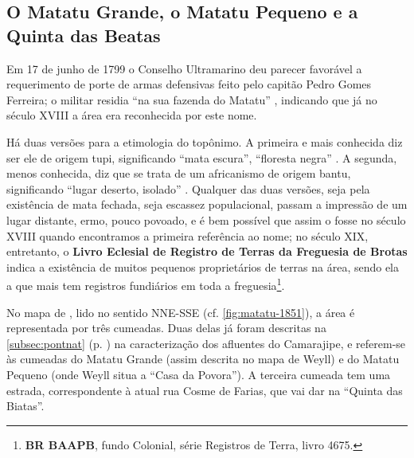 \subsection{O Matatu Grande, o Matatu Pequeno e a Quinta das Beatas}\label{subsec:matatubeatas}

Em 17 de junho de 1799 o Conselho Ultramarino deu parecer favorável a requerimento de porte de armas defensivas feito pelo capitão Pedro Gomes Ferreira; o militar residia ``na sua fazenda do Matatu'' \cite[p.~228]{castralmeida_ultramar_1914}, indicando que já no século XVIII a área era reconhecida por este nome. 

Há duas versões para a etimologia do topônimo. A primeira e mais conhecida diz ser ele de origem tupi, significando ``mata escura'', ``floresta negra'' \cite[p.~281]{sampaio_tupi_1987}. A segunda, menos conhecida, diz que se trata de um africanismo de origem bantu, significando ``lugar deserto, isolado'' \cite[p. 46]{dorea_ruas_2006}. Qualquer das duas versões, seja pela existência de mata fechada, seja escassez populacional, passam a impressão de um lugar distante, ermo, pouco povoado, e é bem possível que assim o fosse no século XVIII quando encontramos a primeira referência ao nome; no século XIX, entretanto, o \textbf{Livro Eclesial de Registro de Terras da Freguesia de Brotas} indica a existência de muitos pequenos proprietários de terras na área, sendo ela a que mais tem registros fundiários em toda a freguesia\footnote{\textbf{BR BAAPB}, fundo Colonial, série Registros de Terra, livro 4675.}.

No mapa de , lido no sentido NNE-SSE (cf. \autoref{fig:matatu-1851}), a área é representada por três cumeadas. Duas delas já foram descritas na \autoref{subsec:pontnat} (p. \pageref{subsec:pontnat}) na caracterização dos afluentes do Camarajipe, e referem-se às cumeadas do Matatu Grande (assim descrita no mapa de Weyll) e do Matatu Pequeno (onde Weyll situa a ``Casa da Povora''). A terceira cumeada tem uma estrada, correspondente à atual rua Cosme de Farias, que vai dar na ``Quinta das Biatas''.

